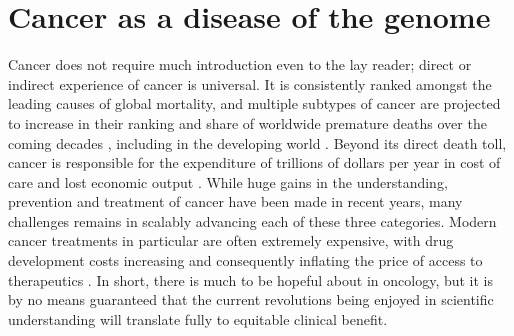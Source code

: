 \documentclass[../thesis.tex]{subfiles}
\begin{document}
\section{Cancer as a disease of the genome}
Cancer does not require much introduction even to the lay reader; direct or indirect experience of cancer is universal. It is consistently ranked amongst the leading causes of global mortality, and multiple subtypes of cancer are projected to increase in their ranking and share of worldwide premature deaths over the coming decades \citep{mathers_projections_2006}, including in the developing world \citep{kanavos_rising_2006}. Beyond its direct death toll, cancer is responsible for the expenditure of trillions of dollars per year in cost of care and lost economic output \citep{wild_world_2020}. While huge gains in the understanding, prevention and treatment of cancer have been made in recent years, many challenges remains in scalably advancing each of these three categories. Modern cancer treatments in particular are often extremely expensive, with drug development costs increasing and consequently inflating the price of access to therapeutics \citep{howard_pricing_2015}. In short, there is much to be hopeful about in oncology, but it is by no means guaranteed that the current revolutions being enjoyed in scientific understanding will translate fully to equitable clinical benefit.
\end{document}
